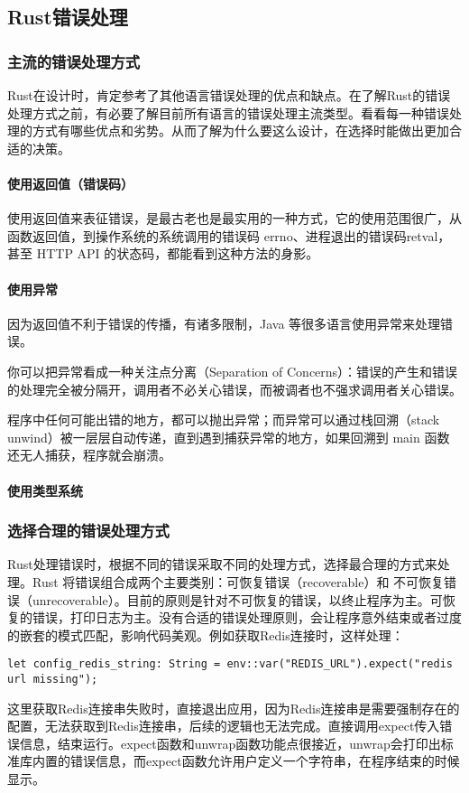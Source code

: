 \documentclass[../../../dolphin-book-2023.tex]{subfiles}
\begin{document}
\subsection{Rust错误处理}

\subsubsection{主流的错误处理方式}

Rust在设计时，肯定参考了其他语言错误处理的优点和缺点。在了解Rust的错误处理方式之前，有必要了解目前所有语言的错误处理主流类型。看看每一种错误处理的方式有哪些优点和劣势。从而了解为什么要这么设计，在选择时能做出更加合适的决策。

\paragraph{使用返回值（错误码）}

使用返回值来表征错误，是最古老也是最实用的一种方式，它的使用范围很广，从函数返回值，到操作系统的系统调用的错误码 errno、进程退出的错误码retval，甚至 HTTP API 的状态码，都能看到这种方法的身影。

\paragraph{使用异常}

因为返回值不利于错误的传播，有诸多限制，Java 等很多语言使用异常来处理错误。

你可以把异常看成一种关注点分离（Separation of Concerns）：错误的产生和错误的处理完全被分隔开，调用者不必关心错误，而被调者也不强求调用者关心错误。

程序中任何可能出错的地方，都可以抛出异常；而异常可以通过栈回溯（stack unwind）被一层层自动传递，直到遇到捕获异常的地方，如果回溯到 main 函数还无人捕获，程序就会崩溃。


\paragraph{使用类型系统}



\subsubsection{选择合理的错误处理方式}

Rust处理错误时，根据不同的错误采取不同的处理方式，选择最合理的方式来处理。Rust 将错误组合成两个主要类别：可恢复错误（recoverable）和 不可恢复错误（unrecoverable）。目前的原则是针对不可恢复的错误，以终止程序为主。可恢复的错误，打印日志为主。没有合适的错误处理原则，会让程序意外结束或者过度的嵌套的模式匹配，影响代码美观。例如获取Redis连接时，这样处理：

\begin{lstlisting}
let config_redis_string: String = env::var("REDIS_URL").expect("redis url missing");
\end{lstlisting}

这里获取Redis连接串失败时，直接退出应用，因为Redis连接串是需要强制存在的配置，无法获取到Redis连接串，后续的逻辑也无法完成。直接调用expect传入错误信息，结束运行。expect函数和unwrap函数功能点很接近，unwrap会打印出标准库内置的错误信息，而expect函数允许用户定义一个字符串，在程序结束的时候显示。
\end{document}
